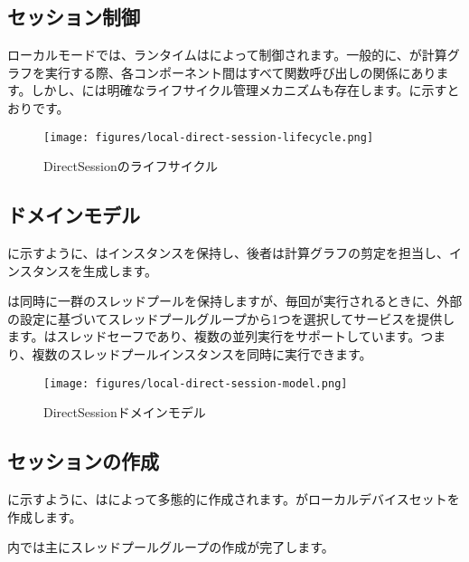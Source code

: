 \begin{content}
\section{セッション制御}

ローカルモードでは、ランタイムはによって制御されます。一般的に、が計算グラフを実行する際、各コンポーネント間はすべて関数呼び出しの関係にあります。しかし、には明確なライフサイクル管理メカニズムも存在します。に示すとおりです。

\begin{figure}[H]
\centering
\texttt{[image: figures/local-direct-session-lifecycle.png]}
\caption{DirectSessionのライフサイクル}
 \label{fig:local-direct-session-lifecycle}
\end{figure}

\subsection{ドメインモデル}

に示すように、はインスタンスを保持し、後者は計算グラフの剪定を担当し、インスタンスを生成します。

は同時に一群のスレッドプールを保持しますが、毎回が実行されるときに、外部の設定に基づいてスレッドプールグループから1つを選択してサービスを提供します。はスレッドセーフであり、複数の並列実行をサポートしています。つまり、複数のスレッドプールインスタンスを同時に実行できます。

\begin{figure}[H]
\centering
\texttt{[image: figures/local-direct-session-model.png]}
\caption{DirectSessionドメインモデル}
 \label{fig:local-direct-session-model}
\end{figure}

\subsection{セッションの作成}

に示すように、はによって多態的に作成されます。がローカルデバイスセットを作成します。

内では主にスレッドプールグループの作成が完了します。


\end{content}
